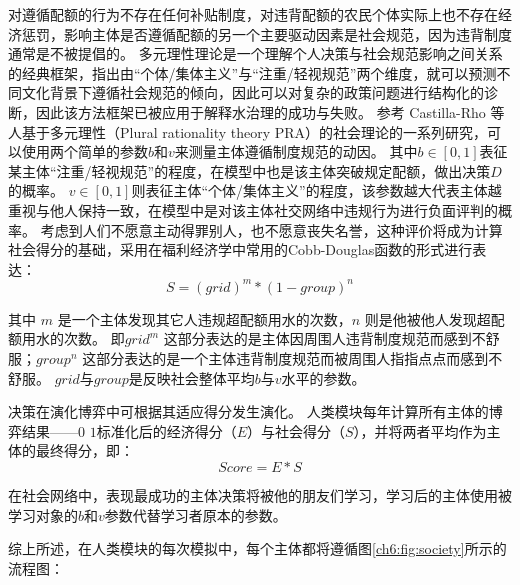 对遵循配额的行为不存在任何补贴制度，对违背配额的农民个体实际上也不存在经济惩罚，影响主体是否遵循配额的另一个主要驱动因素是社会规范，因为违背制度通常是不被提倡的。
多元理性理论是一个理解个人决策与社会规范影响之间关系的经典框架，指出由“个体/集体主义”与“注重/轻视规范”两个维度，就可以预测不同文化背景下遵循社会规范的倾向\cite{verweij2015}，因此可以对复杂的政策问题进行结构化的诊断，因此该方法框架已被应用于解释水治理的成功与失败。
参考 Castilla-Rho 等人基于多元理性（Plural rationality theory PRA）的社会理论的一系列研究，可以使用两个简单的参数$b$和$v$来测量主体遵循制度规范的动因\cite{castilla-rho2015, castilla-rho2017, castilla-rho2020}。
其中$b\in[0, 1]$表征某主体“注重/轻视规范”的程度，在模型中也是该主体突破规定配额，做出决策$D$的概率。
$v \in [0, 1]$则表征主体“个体/集体主义”的程度，该参数越大代表主体越重视与他人保持一致，在模型中是对该主体社交网络中违规行为进行负面评判的概率。
考虑到人们不愿意主动得罪别人，也不愿意丧失名誉，这种评价将成为计算社会得分的基础，采用在福利经济学中常用的Cobb-Douglas函数的形式进行表达：
\begin{equation}
    S = {(grid)}^m * {(1 - group)}^n
    \label{ch6:eq:society}
\end{equation}

其中 $m$ 是一个主体发现其它人违规超配额用水的次数，$n$ 则是他被他人发现超配额用水的次数。
即$grid^m$ 这部分表达的是主体因周围人违背制度规范而感到不舒服；$group^n$ 这部分表达的是一个主体违背制度规范而被周围人指指点点而感到不舒服。
$grid$与$group$是反映社会整体平均$b$与$v$水平的参数。

决策在演化博弈中可根据其适应得分发生演化。
人类模块每年计算所有主体的博弈结果——$0$ \textendash{} $1$标准化后的经济得分（$E$）与社会得分（$S$），并将两者平均作为主体的最终得分，即：
\begin{equation}
    \label{ch6:eq:score}
    Score = E * S
\end{equation}

在社会网络中，表现最成功的主体决策将被他的朋友们学习，学习后的主体使用被学习对象的$b$和$v$参数代替学习者原本的参数。

综上所述，在人类模块的每次模拟中，每个主体都将遵循图\ref{ch6:fig:society}所示的流程图：

